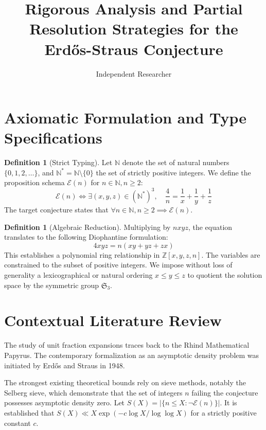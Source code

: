 \documentclass[12pt, a4paper]{article}
\title{Rigorous Analysis and Partial Resolution Strategies for the Erd\H{o}s-Straus Conjecture}
\author{Independent Researcher}
\date{}
\theoremstyle{definition}
\newtheorem{definition}[theorem]{Definition}
\theoremstyle{remark}
\begin{document}
\maketitle
\tableofcontents
\newpage

\section{Axiomatic Formulation and Type Specifications}

\begin{definition}[Strict Typing]
Let $\mathbb{N}$ denote the set of natural numbers $\{0, 1, 2, \dots\}$, and $\mathbb{N}^* = \mathbb{N} \setminus \{0\}$ the set of strictly positive integers.
We define the proposition schema $\mathcal{E}(n)$ for $n \in \mathbb{N}, n \ge 2$:
\begin{equation}
\mathcal{E}(n) \iff \exists (x, y, z) \in (\mathbb{N}^*)^3, \quad \frac{4}{n} = \frac{1}{x} + \frac{1}{y} + \frac{1}{z}
\end{equation}
The target conjecture states that $\forall n \in \mathbb{N}, n \ge 2 \implies \mathcal{E}(n)$.
\end{definition}

\begin{definition}[Algebraic Reduction]
Multiplying by $nxyz$, the equation translates to the following Diophantine formulation:
\begin{equation}
4xyz = n(xy + yz + zx)
\end{equation}
This establishes a polynomial ring relationship in $\mathbb{Z}[x,y,z,n]$. The variables are constrained to the subset of positive integers. We impose without loss of generality a lexicographical or natural ordering $x \le y \le z$ to quotient the solution space by the symmetric group $\mathfrak{S}_3$.
\end{definition}

\section{Contextual Literature Review}

The study of unit fraction expansions traces back to the Rhind Mathematical Papyrus. The contemporary formalization as an asymptotic density problem was initiated by Erd\H{o}s and Straus in 1948.

The strongest existing theoretical bounds rely on sieve methods, notably the Selberg sieve, which demonstrate that the set of integers $n$ failing the conjecture possesses asymptotic density zero. Let $S(X) = |\{n \le X : \neg \mathcal{E}(n)\}|$. It is established that $S(X) \ll X \exp(-c \log X / \log \log X)$ for a strictly positive constant $c$.
\end{document}
